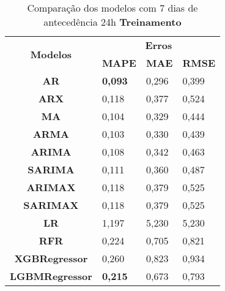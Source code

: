 \begin{table}[H]
	\centering
	\caption{Comparação dos modelos com 7 dias de antecedência 24h \textbf{Treinamento} }\label{tb:10-24trn}
	\begin{tabular}{@{}clll@{}}
		\toprule
		\multirow{2}{*}{\textbf{Modelos}} & \multicolumn{3}{c}{\textbf{Erros}}                                                                       \\ \cmidrule(l){2-4} 
		& \multicolumn{1}{c}{\textbf{MAPE}} & \multicolumn{1}{c}{\textbf{MAE}} & \multicolumn{1}{c}{\textbf{RMSE}} \\ \hline
\textbf{AR}                       & \textbf{0,093}                             & 0,296                            & 0,399                             \\
\textbf{ARX}                      & 0,118                             & 0,377                            & 0,524                             \\
\textbf{MA}                       & 0,104                             & 0,329                            & 0,444                             \\
\textbf{ARMA}                     & 0,103                             & 0,330                            & 0,439                             \\
\textbf{ARIMA}                    & 0,108                             & 0,342                            & 0,463                             \\
\textbf{SARIMA}                   & 0,111                             & 0,360                            & 0,487                             \\
\textbf{ARIMAX}                   & 0,118                             & 0,379                            & 0,525                             \\
\textbf{SARIMAX}                  & 0,118                             & 0,379                            & 0,525                             \\
\textbf{LR}                       & 1,197                             & 5,230                            & 5,230                             \\
\textbf{RFR}                      & 0,224                             & 0,705                            & 0,821                             \\
\textbf{XGBRegressor}             & 0,260                             & 0,823                            & 0,934                             \\
\textbf{LGBMRegressor}            & \textbf{0,215 }                            & 0,673                            & 0,793                             \\ \bottomrule
	\end{tabular}

\end{table}

